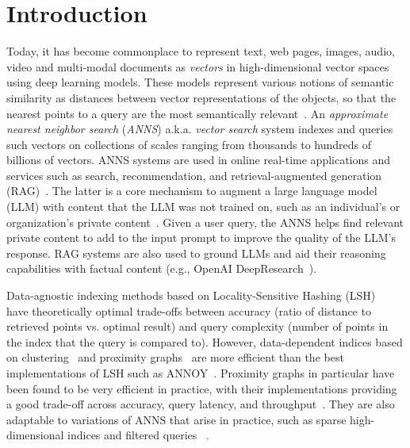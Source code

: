 
\section{Introduction}

Today, it has become commonplace to represent text,  web pages, images,
audio,  video and multi-modal documents as \emph{vectors} in high-dimensional vector spaces using deep learning models. 
These models represent various notions of semantic similarity as distances between
vector representations of the objects, so that the nearest points to a query are the
most semantically relevant~\cite{clip, ance, trecDL22}.
An \emph{approximate nearest neighbor search} (\emph{ANNS}) a.k.a. \emph{vector search}
system indexes and queries such vectors on collections of scales ranging from thousands
to hundreds of billions of vectors.
ANNS systems are used in online real-time applications and services such as search,
recommendation, and retrieval-augmented generation (RAG)~\cite{rag}. 
The latter is a core mechanism to augment a large language model (LLM) with content that
the LLM was not trained on, such as an individual's or organization's private content~\cite{copilot}.
Given a user query, the ANNS helps find relevant private content to add to the input prompt
to improve the quality of the LLM's response.
RAG systems are also used to ground LLMs and aid their reasoning capabilities with factual content
(e.g., OpenAI DeepResearch~\cite{deepresearch}).


Data-agnostic indexing methods based on Locality-Sensitive Hashing (LSH)~\cite{Indyk98, LSHSurvey08, Broder98}
have theoretically optimal trade-offs between accuracy (ratio of distance to retrieved points
vs. optimal result) and query complexity (number of points in the index that the query is compared to).
However, data-dependent indices based on clustering~\cite{IMI12, douze2024faiss, SPANN}
and proximity graphs~\cite{HNSW16, RNG, iwasaki2018, DiskANN19} are more
efficient than the best implementations of LSH such as ANNOY~\cite{github:annoy}.
Proximity graphs in particular have been found to be very efficient in practice, with  their implementations
providing a good trade-off across accuracy, query latency, and  throughput~\cite{Benchmark, bigann21, bigann23}.
They are also adaptable to variations of ANNS that arise in practice, such as sparse high-dimensional indices
and filtered queries ~\cite{bigann23, FilteredDiskANN, acorn}.


